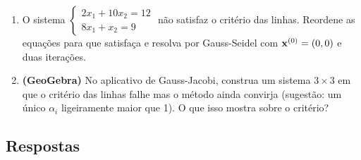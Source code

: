 \begin{enumerate}[label=\textbf{\arabic*.},leftmargin=*]
\item O sistema $\begin{cases}2x_1+10x_2=12\\8x_1+x_2=9\end{cases}$ não satisfaz o critério das
  linhas. Reordene as equações para que satisfaça e resolva por Gauss-Seidel com
  $\mathbf{x}^{(0)}=(0,0)$ e duas iterações.

\item \textbf{(GeoGebra)} No aplicativo de Gauss-Jacobi, construa um sistema $3\times3$ em que
  o critério das linhas falhe mas o método ainda convirja (sugestão: um único $\alpha_i$
  ligeiramente maior que 1). O que isso mostra sobre o critério?
\end{enumerate}

\subsection*{Respostas}
